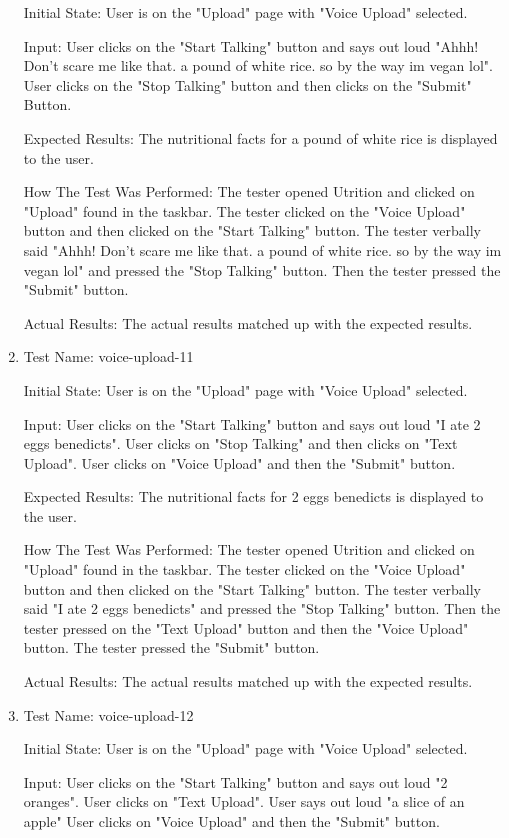 \documentclass[12pt, titlepage]{article}
\begin{document}
\begin{enumerate}
		Initial State: User is on the "Upload" page with "Voice Upload" selected.
		
		Input: User clicks on the "Start Talking" button and says out loud "Ahhh! Don't scare me like that. a pound of white rice. so by the way im vegan lol". User clicks on the "Stop Talking" button and then clicks on the "Submit" Button.
		
		Expected Results: The nutritional facts for a pound of white rice is displayed to the user.
		
		How The Test Was Performed: The tester opened Utrition and clicked on "Upload" found in the taskbar. The tester clicked on the "Voice Upload" button and then clicked on the "Start Talking" button. The tester verbally said "Ahhh! Don't scare me like that. a pound of white rice. so by the way im vegan lol" and pressed the "Stop Talking" button. Then the tester pressed the "Submit" button.
		
		Actual Results: The actual results matched up with the expected results.
	
		\item{Test Name: voice-upload-11}
		
		Initial State: User is on the "Upload" page with "Voice Upload" selected.
		
		Input: User clicks on the "Start Talking" button and says out loud "I ate 2 eggs benedicts". User clicks on "Stop Talking" and then clicks on "Text Upload". User clicks on "Voice Upload" and then the "Submit" button.
		
		Expected Results: The nutritional facts for 2 eggs benedicts is displayed to the user.
		
		How The Test Was Performed: The tester opened Utrition and clicked on "Upload" found in the taskbar. The tester clicked on the "Voice Upload" button and then clicked on the "Start Talking" button. The tester verbally said "I ate 2 eggs benedicts" and pressed the "Stop Talking" button. Then the tester pressed on the "Text Upload" button and then the "Voice Upload" button. The tester pressed the "Submit" button.
		
		Actual Results: The actual results matched up with the expected results.
		
		\item{Test Name: voice-upload-12}
		
		Initial State: User is on the "Upload" page with "Voice Upload" selected.
		
		Input: User clicks on the "Start Talking" button and says out loud "2 oranges". User clicks on "Text Upload". User says out loud "a slice of an apple" User clicks on "Voice Upload" and then the "Submit" button.
		

\end{enumerate}
\end{document}
